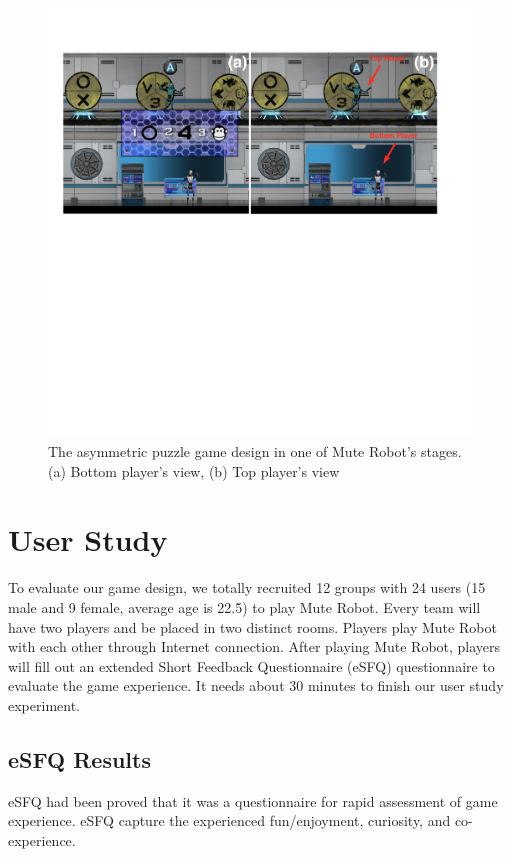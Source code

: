 \documentclass{sigchi}
\begin{document}
\begin{figure}[!h]
\centering
\includegraphics[width=1.0\columnwidth]{Figures/GD_F2.pdf}
\caption{The asymmetric puzzle game design in one of Mute Robot's stages. (a) Bottom player's view, (b) Top player's view}
\label{fig:GD_F2}
\end{figure}

\section{User Study}

To evaluate our game design, we totally recruited 12 groups with 24 users (15 male and 9 female, average age is 22.5) to play Mute Robot.  Every team will have two players and be placed in two distinct rooms. Players play Mute Robot with each other through Internet connection. After playing Mute Robot, players will fill out an extended Short Feedback Questionnaire (eSFQ) \cite{eSFQ} questionnaire to evaluate the game experience. It needs about 30 minutes to finish our user study experiment. 

\subsection{eSFQ Results}

eSFQ \cite{eSFQ} had been proved that it was a questionnaire for rapid assessment of game experience. eSFQ capture the experienced fun/enjoyment, curiosity, and co-experience. 
\end{document}
